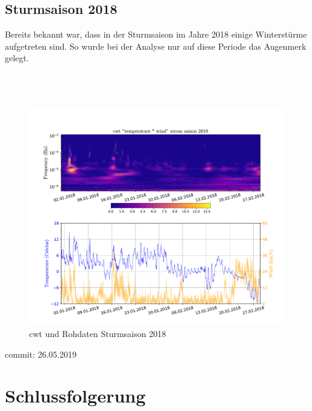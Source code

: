 \begin{refsection}
\subsection{Sturmsaison 2018}
Bereits bekannt war, dass in der Sturmsaison im Jahre 2018 einige Winterstürme aufgetreten sind.
So wurde bei der Analyse nur auf diese Periode das Augenmerk gelegt.
\\
\\
\\
\\

\begin{figure}
	\centering
	\includegraphics[width=1\textwidth]{papers/wwt/images/storm.pdf}
	\caption{cwt und Rohdaten Sturmsaison 2018}
	\label{fig:cwt_storm}
\end{figure}
commit: 26.05.2019





\section{Schlussfolgerung}

\printbibliography[heading=subbibliography]
\end{refsection}
